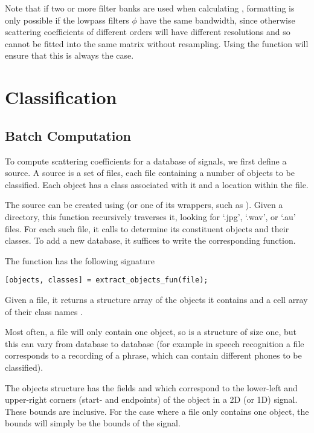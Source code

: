 \documentclass[twocolumn]{article}
\begin{document}
Note that if two or more filter banks are used when calculating , formatting is only possible if the lowpass filters $\phi$ have the same bandwidth, since otherwise scattering coefficients of different orders will have different resolutions and so cannot be fitted into the same matrix without resampling. Using the  function will ensure that this is always the case.

\section{Classification}

\subsection{Batch Computation}

To compute scattering coefficients for a database of signals, we first define a source. A source is a set of files, each file containing a number of objects to be classified. Each object has a class associated with it and a location within the file.

The source can be created using  (or one of its wrappers, such as ). Given a directory, this function recursively traverses it, looking for `.jpg', `.wav', or `.au' files. For each such file, it calls  to determine its constituent objects and their classes. To add a new database, it suffices to write the corresponding  function.

The  function has the following signature
\begin{lstlisting}
[objects, classes] = extract_objects_fun(file);
\end{lstlisting}
Given a file, it returns a structure array  of the objects it contains and a cell array of their class names . 

Most often, a file will only contain one object, so  is a  structure of size one, but this can vary from database to database (for example in speech recognition a file corresponds to a recording of a phrase, which can contain different phones to be classified).

The objects structure has the fields  and  which correspond to the lower-left and upper-right corners (start- and endpoints) of the object in a 2D (or 1D) signal. These bounds are inclusive. For the case where a file only contains one object, the bounds will simply be the bounds of the signal.
\end{document}
